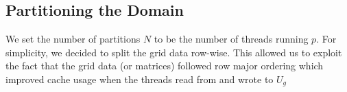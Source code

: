 \documentclass{article}
\begin{document}


\subsection{Partitioning the Domain}
We set the number of partitions $N$ to be the number of threads running $p$. For simplicity, we decided to split 
the grid data row-wise. This allowed us to exploit the fact that the grid data (or matrices) followed row major ordering which  
improved cache usage when the threads read from and wrote to $U_g$








\end{document}
